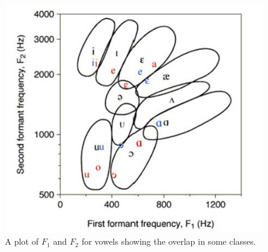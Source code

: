 \documentclass[twoside]{article}
\begin{document}
\begin{figure}
\caption{A plot of $F_1$ and $F_2$ for vowels showing the overlap in some classes.}
\centering
\includegraphics[scale=.5]{../figures/vowelchart.jpg}
\end{figure}
\end{document}

